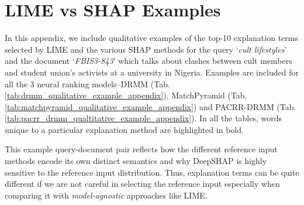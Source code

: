 
\chapter{LIME vs SHAP Examples} %

\label{AppendixA} %


In this appendix, we include qualitative examples of the top-10 explanation terms selected by LIME and the various SHAP methods for the query `\textit{cult lifestyles}' and the document `\textit{FBIS3-843}' which talks about clashes between cult members and student union's activists at a university in Nigeria. Examples are included for all the 3 neural ranking models--DRMM (Tab. \ref{tab:drmm_qualitative_example_appendix}), MatchPyramid (Tab. \ref{tab:matchpyramid_qualitative_example_appendix}) and PACRR-DRMM (Tab. \ref{tab:pacrr_drmm_qualtitative_example_appendix}). In all the tables, words unique to a particular explanation method are highlighted in bold.

This example query-document pair reflects how the different reference input methods encode its own distinct semantics and why DeepSHAP is highly sensitive to the reference input distribution. Thus, explanation terms can be quite different if we are not careful in selecting the reference input especially when comparing it with \textit{model-agnostic} approaches like LIME.

